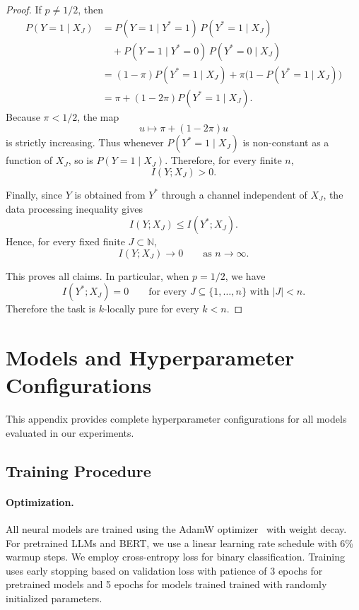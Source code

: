 \documentclass{article}
\theoremstyle{plain}
\theoremstyle{definition}
\theoremstyle{remark}
\begin{document}
\begin{proof}
If \(p\neq 1/2\), then
\begin{align*}
P(Y=1\mid X_J)
&=
P(Y=1\mid Y^*=1)\,P(Y^*=1\mid X_J) \\
&\quad +
P(Y=1\mid Y^*=0)\,P(Y^*=0\mid X_J) \\
&=
(1-\pi)P(Y^*=1\mid X_J)
+
\pi\bigl(1-P(Y^*=1\mid X_J)\bigr) \\
&=
\pi + (1-2\pi)P(Y^*=1\mid X_J).
\end{align*}
Because \(\pi<1/2\), the map
\[
u \mapsto \pi + (1-2\pi)u
\]
is strictly increasing. Thus whenever \(P(Y^*=1\mid X_J)\) is non-constant as a
function of \(X_J\), so is \(P(Y=1\mid X_J)\). Therefore, for every finite \(n\),
\[
I(Y;X_J)>0.
\]

Finally, since \(Y\) is obtained from \(Y^*\) through a channel independent of \(X_J\),
the data processing inequality gives
\[
I(Y;X_J)\le I(Y^*;X_J).
\]
Hence, for every fixed finite \(J\subset\mathbb N\),
\[
I(Y;X_J)\to 0
\qquad\text{as } n\to\infty.
\]

This proves all claims. In particular, when \(p=1/2\), we have
\[
I(Y^*;X_J)=0
\qquad
\text{for every } J\subseteq \{1,\ldots,n\}\text{ with } |J|<n.
\]
Therefore the task is \(k\)-locally pure for every \(k<n\).
\end{proof}

\section{Models and Hyperparameter Configurations}
\label{appendix:training}

This appendix provides complete hyperparameter configurations for all models evaluated in our experiments.

\subsection{Training Procedure}
\label{subsec:training_appendix}

\paragraph{Optimization.}
All neural models are trained using the AdamW optimizer~\citep{AdamW} with weight decay. For pretrained LLMs and BERT, we use a linear learning rate schedule with 6\% warmup steps. We employ cross-entropy loss for binary classification. Training uses early stopping based on validation loss with patience of 3 epochs for pretrained models and 5 epochs for models trained trained with randomly initialized parameters.
\end{document}

